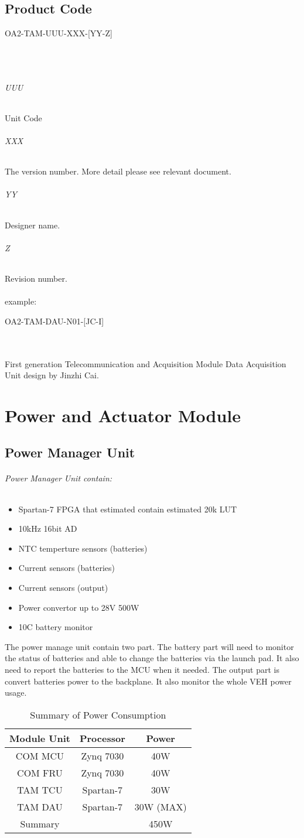 \documentclass[12pt,article]{memoir}
\begin{document}
\section{Product Code}
\begin{LARGE}
OA2-TAM-UUU-XXX-[YY-Z]
\end{LARGE}\\\\
\subparagraph{UUU}
Unit Code
\subparagraph{XXX}
The version number. More detail please see relevant document.
\subparagraph{YY}
Designer name.
\subparagraph{Z}
Revision number.\\\\
example: 
\begin{large}
OA2-TAM-DAU-N01-[JC-I]
\end{large}\\\\
First generation Telecommunication and Acquisition Module Data Acquisition Unit design by Jinzhi Cai.
\newpage
\chapter{Power and Actuator Module}
\section{Power Manager Unit}
\subparagraph{Power Manager Unit contain:}
\begin{itemize}
	\item Spartan-7 FPGA that estimated contain estimated 20k LUT
	\item 10kHz 16bit AD
	\item NTC temperture sensors  (batteries)
	\item Current sensors  (batteries)
	\item Current sensors  (output)
	\item Power convertor up to 28V 500W
	\item 10C battery monitor
\end{itemize}
The power manage unit contain two part. The battery part will need to monitor the status of batteries and able to change the batteries via the launch pad. It also need to report the batteries to the MCU when it needed. The output part is convert batteries power to the backplane. It also monitor the whole VEH power usage.
\begin{table}[H]
	\centering
	\begin{tabu}{ c | c | c }
		Module Unit & Processor & Power\\ \hline
		 COM MCU & Zynq 7030 & 40W\\
		 COM FRU & Zynq 7030 & 40W\\
		 TAM TCU & Spartan-7 & 30W\\
		 TAM DAU & Spartan-7 & 30W (MAX)\\ \hline
		 Summary &   & 450W\\
	\end{tabu}
	\caption{Summary of Power Consumption}
	\label{tab:slc}
\end{table}
\end{document}

